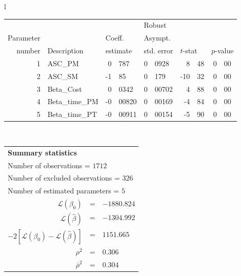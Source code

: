   \begin{tabular}{l}
\begin{tabular}{rlr@{.}lr@{.}lr@{.}lr@{.}l}
         &                       &   \multicolumn{2}{l}{}    & \multicolumn{2}{l}{Robust}  &     \multicolumn{4}{l}{}   \\
Parameter &                       &   \multicolumn{2}{l}{Coeff.}      & \multicolumn{2}{l}{Asympt.}  &     \multicolumn{4}{l}{}   \\
number &  Description                     &   \multicolumn{2}{l}{estimate}      & \multicolumn{2}{l}{std. error}  &   \multicolumn{2}{l}{$t$-stat}  &   \multicolumn{2}{l}{$p$-value}   \\

\hline

1 & ASC_PM  & 0&787 & 0&0928 & 8&48 & 0&00\\
2 & ASC_SM & -1&85 & 0&179 & -10&32 & 0&00\\
3 & Beta_Cost & 0&0342 & 0&00702 & 4&88 & 0&00\\
4 & Beta_time_PM & -0&00820 & 0&00169 & -4&84 & 0&00\\
5 & Beta_time_PT & -0&00911 & 0&00154 & -5&90 & 0&00\\
\hline
\end{tabular}
\\
\begin{tabular}{rcl}
\multicolumn{3}{l}{\bf Summary statistics}\\
\multicolumn{3}{l}{ Number of observations = $1712$} \\
\multicolumn{3}{l}{ Number of excluded observations = $326$} \\
\multicolumn{3}{l}{ Number of estimated  parameters = $5$} \\
 $\mathcal{L}(\beta_0)$ &=&  $-1880.824$ \\
 $\mathcal{L}(\hat{\beta})$ &=& $-1304.992 $  \\
 $-2[\mathcal{L}(\beta_0) -\mathcal{L}(\hat{\beta})]$ &=& $1151.665$ \\
    $\rho^2$ &=&   $0.306$ \\
    $\bar{\rho}^2$ &=&    $0.304$ \\
\end{tabular}
  \end{tabular}
